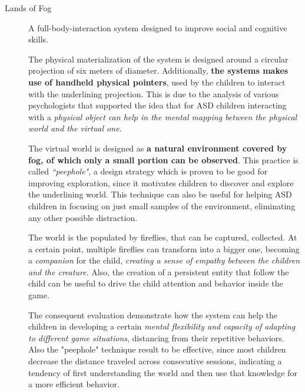 \begin{description}
	\item[Lands of Fog] A full-body-interaction system \cite{mora-guiard_lands_2016} designed to improve social and cognitive skills. 
	
	The physical materialization of the system is designed around a circular projection of six meters of diameter.
	Additionally, \textbf{the systems makes use of handheld physical pointers}, used by the children to interact with the underlining projection.
	This is due to the analysis of various psychologists that supported the idea that for ASD children interacting with a \textit{physical object can help in the mental mapping between the physical world  and the virtual one}.
	
	The virtual world is designed as \textbf{a natural environment covered by fog, of which only a small portion can be observed}.
	This practice is called \textit{``peephole"}, a design strategy which is proven to be good \cite{dalsgaard_between_2014} for improving exploration, since it motivates children to discover and explore the underlining world.
	This technique can also be useful for helping ASD children in focusing on just small samples of the environment, eliminating any other possible distraction.
	
	The world is the populated by fireflies, that can be captured, collected.
	At a certain point, multiple fireflies can transform into a bigger one, becoming a \textit{companion} for the child, \textit{creating a sense of empathy between the children and the creature}.
	Also, the creation of a persistent entity that follow the child can be useful to drive the child attention and behavior inside the game.
	
	The consequent evaluation demonstrate how the system can help the children in developing a certain \textit{mental flexibility and capacity of adapting to different game situations}, distancing from their repetitive behaviors. 
	Also the "peephole" technique result to be effective, since most children decrease the distance traveled across consecutive sessions, indicating a tendency of first understanding the world and then use that knowledge for a more efficient behavior. 
	
	
	
	
	
\end{description}

